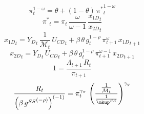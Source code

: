 \documentclass[10pt,a4paper]{article}
\begin{document}
\begin{dmath}
{\pi}_{t}^{1-{\omega}}={\theta}+\left(1-{\theta}\right)\, {\pi^*}_{t}^{1-{\omega}}
\end{dmath}
\begin{dmath}
{\pi^*}_{t}={\pi}_{t}\, \frac{{\omega}}{{\omega}-1}\, \frac{{x_{1D}}_{t}}{{x_{2D}}_{t}}
\end{dmath}
\begin{dmath}
{x_{1D}}_{t}={Y_D}_{t}\, \frac{1}{{\mathcal{M}}_{t}}\, {U_{CD}}_{t}+\beta\, {\theta}\, {g}_{t}^{1-\rho}\, {\pi}_{t+1}^{{\omega}}\, {x_{1D}}_{t+1}
\end{dmath}
\begin{dmath}
{x_{2D}}_{t}={Y_D}_{t}\, {U_{CD}}_{t}+\beta\, {\theta}\, {g}_{t}^{1-\rho}\, {\pi}_{t+1}^{{\omega}-1}\, {x_{2D}}_{t+1}
\end{dmath}
\begin{dmath}
1=\frac{{\Lambda}_{t+1}\, {R}_{t}}{{\pi}_{t+1}}
\end{dmath}
\begin{dmath}
\frac{{R}_{t}}{\left(\beta\, {g^{SS}}^{\left(-\rho\right)}\right)^{\left(-1\right)}}={\pi}_{t}^{{{\gamma}_{\pi}}}\, \left(\frac{\frac{1}{{\mathcal{M}}_{t}}}{\frac{1}{{\mkup^{SS}}}}\right)^{{{\gamma}_{y}}}
\end{dmath}
\end{document}

